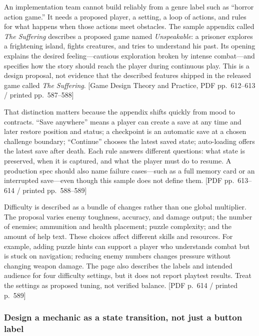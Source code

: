 An implementation team cannot build reliably from a genre label such as ``horror action game.'' It needs a proposed player, a setting, a loop of actions, and rules for what happens when those actions meet obstacles. The sample appendix called \emph{The Suffering} describes a proposed game named \emph{Unspeakable}: a prisoner explores a frightening island, fights creatures, and tries to understand his past. Its opening explains the desired feeling---cautious exploration broken by intense combat---and specifies how the story should reach the player during continuous play. This is a design proposal, not evidence that the described features shipped in the released game called \emph{The Suffering}. {[}Game Design Theory and Practice, PDF pp.~612--613 / printed pp.~587--588{]}

That distinction matters because the appendix shifts quickly from mood to contracts. ``Save anywhere'' means a player can create a save at any time and later restore position and status; a checkpoint is an automatic save at a chosen challenge boundary; ``Continue'' chooses the latest saved state; auto-loading offers the latest save after death. Each rule answers different questions: what state is preserved, when it is captured, and what the player must do to resume. A production spec should also name failure cases---such as a full memory card or an interrupted save---even though this sample does not define them. {[}PDF pp.~613--614 / printed pp.~588--589{]}

Difficulty is described as a bundle of changes rather than one global multiplier. The proposal varies enemy toughness, accuracy, and damage output; the number of enemies; ammunition and health placement; puzzle complexity; and the amount of help text. These choices affect different skills and resources. For example, adding puzzle hints can support a player who understands combat but is stuck on navigation; reducing enemy numbers changes pressure without changing weapon damage. The page also describes the labels and intended audience for four difficulty settings, but it does not report playtest results. Treat the settings as proposed tuning, not verified balance. {[}PDF p.~614 / printed p.~589{]}

\subsubsection{Design a mechanic as a state transition, not just a button label}\label{05-engine-i-ch009-design-a-mechanic-as-a-state-transition-not-just-a-button-label}

